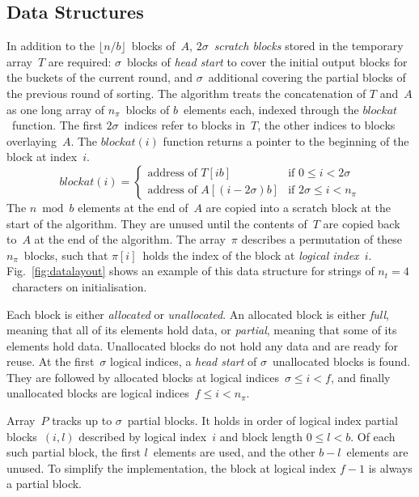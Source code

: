 \documentclass[nolineno,a4paper,UKenglish,cleveref, autoref, thm-restate]{socg-lipics-v2021}
\def\blockat{\textit{blockat}}
\begin{document}
\subsection{Data Structures} \label{sec:datastructures}
In addition to the $\lfloor n/b\rfloor$~blocks of~$A$, $2\sigma$~\emph{scratch
blocks} stored in the temporary array~$T$ are required:
$\sigma$~blocks of \emph{head start} to cover the initial
output blocks for the buckets of the current round, and $\sigma$~additional
covering the partial blocks of the previous round of sorting.
The algorithm treats the concatenation of $T$ and~$A$ as one long array of
$n_\pi$~blocks of $b$~elements each, indexed through the $\blockat$~function.
The first $2\sigma$~indices refer to blocks in~$T$, the other indices to blocks overlaying~$A$.
The $\blockat(i)$ function returns a pointer to the beginning of the block at index~$i$.
\begin{equation}
\blockat(i)=
\begin{cases}
\mbox{address of $T[ib]$}&\mbox{if $0\le i<2\sigma$}\\
\mbox{address of $A[(i-2\sigma)b]$}&\mbox{if $2\sigma\le i<n_\pi$}
\end{cases}
\end{equation}
The $n\bmod b$ elements at the end of~$A$ are copied into a scratch block at
the start of the algorithm.  They are unused until the contents of~$T$
are copied back to~$A$ at the end of the algorithm.
The array~$\pi$ describes a permutation of these $n_\pi$~blocks, such that
$\pi[i]$~holds the index of the block at \emph{logical index}~$i$.
Fig.~\ref{fig:datalayout} shows an example of this data structure for strings of
$n_t=4$~characters on initialisation.

Each block is either \emph{allocated} or \emph{unallocated}.
An allocated block is either
\emph{full}, meaning that all of its elements hold data, or \emph{partial}, meaning that
some of its elements hold data.
Unallocated blocks do not hold any data and are ready for reuse.
At the first~$\sigma$ logical indices, a \emph{head start} of $\sigma$~unallocated blocks
is found.
They are followed by allocated blocks at logical indices~$\sigma\le i<f$,
and finally unallocated blocks are logical indices~$f\le i<n_\pi$.

Array~$P$ tracks up to $\sigma$~partial blocks.
It holds in order of logical index partial blocks~$(i,l)$
described by logical index~$i$ and block length $0\le l<b$.
Of each such partial block, the
first $l$~elements are used, and the other $b-l$~elements are unused.
To simplify the implementation, the block at logical index $f-1$ is always a partial block.
\end{document}
